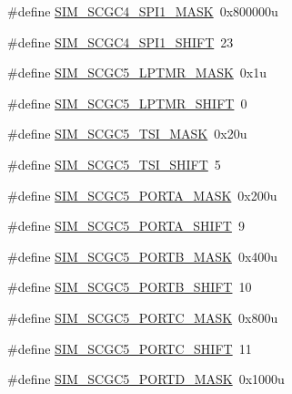 \begin{DoxyCompactItemize}
\item 
\#define \hyperlink{group___s_i_m___register___masks_ga40dc8e1653911d8e12103bc4ef9d66d1}{S\+I\+M\+\_\+\+S\+C\+G\+C4\+\_\+\+S\+P\+I1\+\_\+\+M\+A\+SK}~0x800000u
\item 
\#define \hyperlink{group___s_i_m___register___masks_ga0bc6038c3a8a17fec28bc6980ad293e4}{S\+I\+M\+\_\+\+S\+C\+G\+C4\+\_\+\+S\+P\+I1\+\_\+\+S\+H\+I\+FT}~23
\item 
\#define \hyperlink{group___s_i_m___register___masks_ga6f63b73e0ad63163df381c795d583cc1}{S\+I\+M\+\_\+\+S\+C\+G\+C5\+\_\+\+L\+P\+T\+M\+R\+\_\+\+M\+A\+SK}~0x1u
\item 
\#define \hyperlink{group___s_i_m___register___masks_ga9b3669f3f4f380e18133785d6356c56c}{S\+I\+M\+\_\+\+S\+C\+G\+C5\+\_\+\+L\+P\+T\+M\+R\+\_\+\+S\+H\+I\+FT}~0
\item 
\#define \hyperlink{group___s_i_m___register___masks_ga12aa3509d85f1dddc69c48821f4f3225}{S\+I\+M\+\_\+\+S\+C\+G\+C5\+\_\+\+T\+S\+I\+\_\+\+M\+A\+SK}~0x20u
\item 
\#define \hyperlink{group___s_i_m___register___masks_ga3e9511b0e9cf6b524a0a405b172038da}{S\+I\+M\+\_\+\+S\+C\+G\+C5\+\_\+\+T\+S\+I\+\_\+\+S\+H\+I\+FT}~5
\item 
\#define \hyperlink{group___s_i_m___register___masks_ga9c4853233394870202cccd7844fc8a56}{S\+I\+M\+\_\+\+S\+C\+G\+C5\+\_\+\+P\+O\+R\+T\+A\+\_\+\+M\+A\+SK}~0x200u
\item 
\#define \hyperlink{group___s_i_m___register___masks_gaa7a1683eaa07a5c5adcaddf4b99ed83a}{S\+I\+M\+\_\+\+S\+C\+G\+C5\+\_\+\+P\+O\+R\+T\+A\+\_\+\+S\+H\+I\+FT}~9
\item 
\#define \hyperlink{group___s_i_m___register___masks_ga5509cf72c7508dd77f0a1a9e631943e8}{S\+I\+M\+\_\+\+S\+C\+G\+C5\+\_\+\+P\+O\+R\+T\+B\+\_\+\+M\+A\+SK}~0x400u
\item 
\#define \hyperlink{group___s_i_m___register___masks_ga491c4800f5437a9e2d235a77819e434d}{S\+I\+M\+\_\+\+S\+C\+G\+C5\+\_\+\+P\+O\+R\+T\+B\+\_\+\+S\+H\+I\+FT}~10
\item 
\#define \hyperlink{group___s_i_m___register___masks_gaac31449d101ad0d05f2bed682571be35}{S\+I\+M\+\_\+\+S\+C\+G\+C5\+\_\+\+P\+O\+R\+T\+C\+\_\+\+M\+A\+SK}~0x800u
\item 
\#define \hyperlink{group___s_i_m___register___masks_gae141a6d4af583e7410d0120442b1012f}{S\+I\+M\+\_\+\+S\+C\+G\+C5\+\_\+\+P\+O\+R\+T\+C\+\_\+\+S\+H\+I\+FT}~11
\item 
\#define \hyperlink{group___s_i_m___register___masks_ga723a55222eb5f8fd25da5c956aa50e7b}{S\+I\+M\+\_\+\+S\+C\+G\+C5\+\_\+\+P\+O\+R\+T\+D\+\_\+\+M\+A\+SK}~0x1000u

\end{DoxyCompactItemize}
